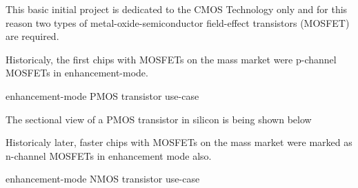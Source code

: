 This basic initial project is dedicated to the CMOS Technology only and for this reason two types of metal-\-oxide-\-semiconductor field-\-effect transistors (MOSFET) are required.

Historicaly, the first chips with MOSFETs on the mass market were p-channel MOSFETs in enhancement-mode.

\begin{center}
    enhancement-mode PMOS transistor use-case
    \begin{figure}[h] %
        \centering
        \begin{circuitdiagram}{20}{20}
        \end{circuitdiagram}
    \end{figure}
\end{center}

The sectional view of a PMOS transistor in silicon is being shown below

Historicaly later, faster chips with MOSFETs on the mass market were marked as n-channel MOSFETs in enhancement mode also.

\begin{center}
    enhancement-mode NMOS transistor use-case
    \begin{figure}[h] %
        \centering
        \begin{circuitdiagram}{20}{20}
        \end{circuitdiagram}
    \end{figure}
\end{center}

